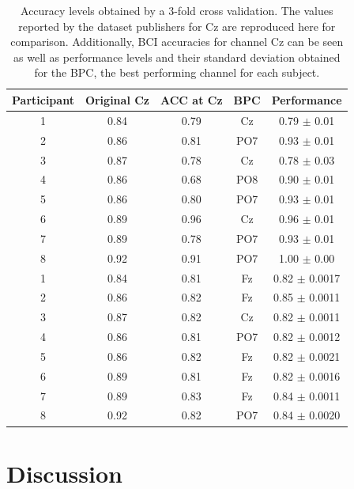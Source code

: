 \documentclass[sensors,article,submit,moreauthors,pdftex,10pt,a4paper]{mdpi}
\begin{document}
\begin{table}[H]
\caption{Accuracy levels obtained by a 3-fold cross validation. The values reported by the dataset publishers for Cz are reproduced here for comparison. Additionally, BCI accuracies for channel Cz can be seen as well as performance levels and their standard deviation obtained for the BPC, the best performing channel for each subject.}
\centering
\begin{tabular}{ccccc}
\toprule
\textbf{Participant}	& \textbf{Original Cz}	& \textbf{ACC at Cz}	& \textbf{BPC}	& \textbf{Performance}\\
\midrule
1     &   0.84 &   0.79 & Cz  &   0.79 $\pm$ 0.01 \\
2     &   0.86 &   0.81 & PO7 &   0.93 $\pm$ 0.01 \\
3     &   0.87 &   0.78 & Cz  &   0.78 $\pm$ 0.03 \\
4     &   0.86 &   0.68 & PO8 &   0.90 $\pm$ 0.01 \\
5     &   0.86 &   0.80 & PO7 &   0.93 $\pm$ 0.01 \\
6     &   0.89 &   0.96 & Cz  &   0.96 $\pm$ 0.01 \\
7     &   0.89 &   0.78 & PO7 &   0.93 $\pm$ 0.01 \\
8     &   0.92 &   0.91 & PO7 &   1.00 $\pm$ 0.00 \\
1     &   0.84 &   0.81& Fz&   0.82 $\pm$ 0.0017 \\
2     &   0.86 &   0.82& Fz&   0.85 $\pm$ 0.0011 \\
3     &   0.87 &   0.82& Cz&   0.82 $\pm$ 0.0011 \\
4     &   0.86 &   0.81& PO7&   0.82 $\pm$ 0.0012 \\
5     &   0.86 &   0.82& Fz&   0.82 $\pm$ 0.0021 \\
6     &   0.89 &   0.81& Fz&   0.82 $\pm$ 0.0016 \\
7     &   0.89 &   0.83& Fz&   0.84 $\pm$ 0.0011 \\
8     &   0.92 &   0.82& PO7&   0.84 $\pm$ 0.0020 \\
\bottomrule
\end{tabular}
\label{tab:results}
\end{table}

\section{Discussion}
\end{document}
